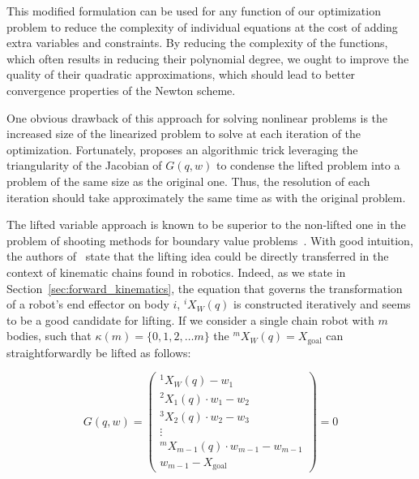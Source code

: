 This modified formulation can be used for any function of our optimization problem to reduce the complexity of individual equations at the cost of adding extra variables and constraints.
By reducing the complexity of the functions, which often results in reducing their polynomial degree, we ought to improve the quality of their quadratic approximations, which should lead to better convergence properties of the Newton scheme.


One obvious drawback of this approach for solving nonlinear problems is the increased size of the linearized problem to solve at each iteration of the optimization.
Fortunately, \cite{Albersmeyer:2010:LNM:1958447.1958472} proposes an algorithmic trick leveraging the triangularity of the Jacobian of $G(q,w)$ to condense the lifted problem into a problem of the same size as the original one.
Thus, the resolution of each iteration should take approximately the same time as with the original problem.

The lifted variable approach is known to be superior to the non-lifted one in the problem of shooting methods for boundary value problems~\cite{osborne:1969:shooting}.
With good intuition, the authors of~\cite{Albersmeyer:2010:LNM:1958447.1958472} state that the lifting idea could be directly transferred in the context of kinematic chains found in robotics.
Indeed, as we state in Section~\ref{sec:forward_kinematics}, the equation that governs the transformation of a robot's end effector on body $i$, ${}^i X_W(q)$ is constructed iteratively and seems to be a good candidate for lifting.
If we consider a single chain robot with $m$ bodies, such that $\kappa (m) = \{0, 1, 2, \ldots m\}$ the ${}^m X_W(q) = X_\text{goal}$ can straightforwardly be lifted as follows:

\begin{equation}
\label{eq:robot_lift}
  G(q,w) =
  \begin{pmatrix}
  {}^1 X_W(q) - w_1 \\
  {}^2 X_1(q)\cdot w_1 - w_2\\
  {}^3 X_2(q)\cdot w_2 - w_3 \\
  \vdots \\
  {}^m X_{m-1}(q)\cdot w_{m-1} - w_{m-1} \\
  w_{m-1} - X_\text{goal}
  \end{pmatrix}
  =0
\end{equation}

